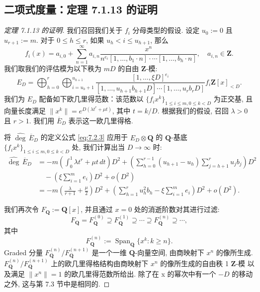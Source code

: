 \subsection{二项式度量：定理 7.1.13 的证明}\label{sec:7.5}

\begin{proof}[定理 7.1.13 的证明]
我们召回我们关于 \(f_i\) 分母类型的假设. 设定 \(u_0 := 0\) 且 \(u_{r+1} := m\). 
对于 \(0 \le h \le r\), 如果 \(u_h < i \le u_{h+1}\), 那么
\[ f_i(x) = a_{i,0} + \sum_{n=1}^{\infty} a_{i,n} \frac{x^n}{n^{e_i}[1,\dots,b_1 \cdot n] \cdot \cdots [1,\dots,b_h \cdot n]}, \quad a_{i,n} \in \mathbf{Z}. \]
我们取我们的评估模为以下秩为 \(mD\) 的自由 \(\mathbf{Z}\)-模:
\[ E_D = \bigoplus_{h=0}^r \bigoplus_{i=u_h+1}^{u_{h+1}} \frac{[1, \dots, \xi D]^{e_i}}{[1, \dots, u_{h+1}b_{h+1}D] \cdots [1, \dots, u_rb_rD]} f_i \mathbf{Z}[x]_{< D}. \]
我们为 \(E_D\) 配备如下欧几里得范数：该范数以 \(\{f_i x^k\}_{1\le i\le m, 0\le k<D}\) 为正交基, 
且向量长度满足 \(\|x^k\| = e^{D(\lambda t^r+\mu t)}\), 其中 \(t = k/D\). 
根据我们的假设, 召回 \(\lambda > 0\) 且 \(r > 1\). 我们用 \(\overline{E}_D\) 表示这一欧几里得格.

将 \(\widehat{\operatorname{deg}} \, \overline{E}_D\) 的定义公式 \eqref{eq:7.2.3} 应用于 \(E_D \otimes \mathbf{Q}\) 
的 \(\mathbf{Q}\)-基底 \(\{f_i x^k\}_{1 \leq i \leq m, 0 \leq k < D}\) 处, 
我们计算出当 \(D \to \infty\) 时:
\begin{equation}\label{eq:7.5.1}
\begin{aligned}
\widehat{\deg} \, \overline{E}_D &= -m \left( \int_0^1 \lambda t^r + \mu t \, dt \right) D^2 + \left( \sum_{h=0}^{r-1} (u_{h+1} - u_h) \sum_{j=h+1}^r u_j b_j \right) D^2 \\
&\quad - \left( \xi \sum_{i=1}^m e_i \right) D^2 + o(D^2) \\
&= -m \left( \frac{\lambda}{r+1} + \frac{\mu}{2} \right) D^2 + \left( \sum_{h=1}^r u_h^2 b_h - \xi \sum_{i=1}^m e_i \right) D^2 + o(D^2).
\end{aligned}
\end{equation}

我们再次令 \(F_{\mathbf{Q}} := \mathbf{Q}[x]\), 并且通过 \(x=0\) 处的消逝阶数对其进行过滤:
\[ F_{\mathbf{Q}} = F_{\mathbf{Q}}^{(0)} \supseteq F_{\mathbf{Q}}^{(1)} \supseteq \cdots \supseteq F_{\mathbf{Q}}^{(n)} \supseteq \cdots, \]
其中
\[ F_{\mathbf{Q}}^{(n)} := \operatorname{Span}_{\mathbf{Q}} \{ x^k : k \ge n \}. \]
Graded 分量 \(F_{\mathbf{Q}}^{(n)}/F_{\mathbf{Q}}^{(n+1)}\) 是一个一维 \(\mathbf{Q}\)-向量空间, 
由商映射下 \(x^n\) 的像所生成. 
\(F_{\mathbf{Q}}^{(n)}/F_{\mathbf{Q}}^{(n+1)}\) 上的欧几里得格结构由商映射下 \(x^n\) 的像所生成的自由秩 1 \(\mathbf{Z}\)-模 
以及满足 \(\|x^n\| = 1\) 的欧几里得范数所给出. 
除了在 x 的幂次中有一个 \(-D\) 的移动之外, 这与第 7.3 节中是相同的.


\end{proof}
